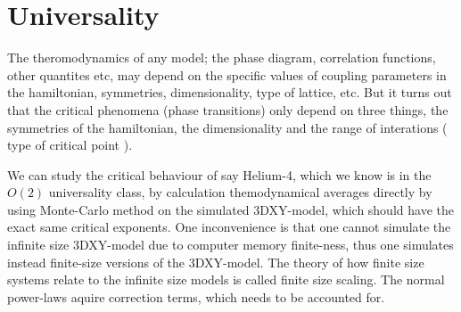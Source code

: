 \section{Universality}
The theromodynamics of any model; the phase diagram, correlation functions, other quantites etc, may depend on the specific values of coupling parameters in the hamiltonian, symmetries, dimensionality, type of lattice, etc. 
But it turns out that the critical phenomena (phase transitions) only depend on three things, the symmetries of the hamiltonian, the dimensionality and the range of interations ( type of critical point ).

We can study the critical behaviour of say Helium-4, which we know is in the $O(2)$ universality class, by calculation themodynamical averages directly by using Monte-Carlo method on the simulated 3DXY-model, which should have the exact same critical exponents. 
One inconvenience is that one cannot simulate the infinite size 3DXY-model due to computer memory finite-ness, thus one simulates instead finite-size versions of the 3DXY-model. The theory of how finite size systems relate to the infinite size models is called finite size scaling. The normal power-laws aquire correction terms, which needs to be accounted for.


